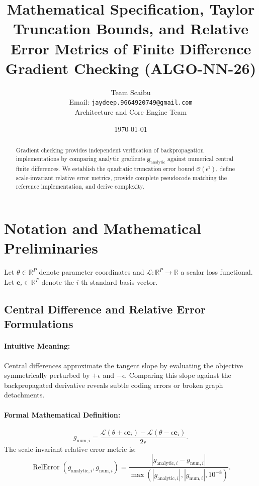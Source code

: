 \documentclass[11pt]{article}
\title{\textbf{Mathematical Specification, Taylor Truncation Bounds, and Relative Error Metrics of Finite Difference Gradient Checking (ALGO-NN-26)}}
\author{Team Scaibu \\ \small Email: \texttt{jaydeep.9664920749@gmail.com} \\ \small Architecture and Core Engine Team}
\date{\today}
\begin{document}
\maketitle

\begin{abstract}
Gradient checking provides independent verification of backpropagation implementations by comparing analytic gradients $\mathbf{g}_{\mathrm{analytic}}$ against numerical central finite differences. We establish the quadratic truncation error bound $\mathcal{O}(\epsilon^2)$, define scale-invariant relative error metrics, provide complete pseudocode matching the reference implementation, and derive complexity.
\end{abstract}

\section{Notation and Mathematical Preliminaries}
\label{sec:notation}

Let $\theta \in \mathbb{R}^P$ denote parameter coordinates and $\mathcal{L}: \mathbb{R}^P \to \mathbb{R}$ a scalar loss functional. Let $\mathbf{e}_i \in \mathbb{R}^P$ denote the $i$-th standard basis vector.

\subsection{Central Difference and Relative Error Formulations}
\paragraph{Intuitive Meaning:} Central differences approximate the tangent slope by evaluating the objective symmetrically perturbed by $+\epsilon$ and $-\epsilon$. Comparing this slope against the backpropagated derivative reveals subtle coding errors or broken graph detachments.

\paragraph{Formal Mathematical Definition:}
\begin{equation}
\label{eq:central_diff}
g_{\mathrm{num}, i} = \frac{\mathcal{L}(\theta + \epsilon \mathbf{e}_i) - \mathcal{L}(\theta - \epsilon \mathbf{e}_i)}{2\epsilon}.
\end{equation}
The scale-invariant relative error metric is:
\begin{equation}
\label{eq:rel_error}
\operatorname{RelError}(g_{\mathrm{analytic}, i}, g_{\mathrm{num}, i}) = \frac{|g_{\mathrm{analytic}, i} - g_{\mathrm{num}, i}|}{\max(|g_{\mathrm{analytic}, i}|, |g_{\mathrm{num}, i}|, 10^{-8})}.
\end{equation}
\end{document}
